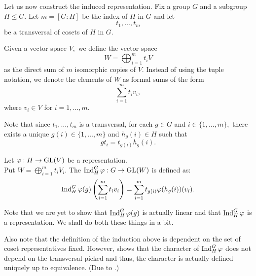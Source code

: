 Let us now construct the induced representation. Fix a group $G$ and a subgroup $H \le G.$ Let $m = [G : H]$ be the index of $H$ in $G$ and let
\begin{equation*} 
	t_1, \ldots, t_m
\end{equation*}
be a transversal of cosets of $H$ in $G.$ 

\begin{defn}
	Given a vector space $V,$ we define the vector space
	\begin{equation*} 
		W = \bigoplus_{i = 1}^m t_iV
	\end{equation*}
	as the direct sum of $m$ isomorphic copies of $V.$ Instead of using the tuple notation, we denote the elements of $W$ as formal sums of the form
	\begin{equation*} 
		\sum_{i = 1}^{m} t_i v_i,
	\end{equation*}
	where $v_i \in V$ for $i = 1, \ldots, m.$
\end{defn}

\begin{defn}
	\label{defn:gttghg}
	Note that since $t_1, \ldots, t_m$ is a transversal, for each $g \in G$ and $i \in \{1, \ldots, m\},$ there exists a unique $g(i) \in \{1, \ldots, m\}$ and $h_g(i) \in H$ such that
	\begin{equation*} 
		gt_i = t_{g(i)}h_g(i).
	\end{equation*}
\end{defn}

\begin{defn}%
	\label{defn:inducedrep2}
	Let $\varphi : H \to \operatorname{GL}(V)$ be a representation.\\
	Put $W = \bigoplus_{i = 1}^m t_iV_i.$
	The  $\operatorname{Ind}^{G}_{H}\varphi : G \to \operatorname{GL}(W)$ is defined as:
	\begin{equation} \label{eq:inducedrepabs}
		\operatorname{Ind}^{G}_{H}\varphi(g)\left(\sum_{i = 1}^{m}t_iv_i\right) = \sum_{i = 1}^{m}t_{g(i)}\varphi(h_g(i))(v_i).
	\end{equation}
\end{defn}

\begin{rem}
	Note that we are yet to show that $\operatorname{Ind}^{G}_{H}\varphi(g)$ is actually linear and that $\operatorname{Ind}^{G}_{H}\varphi$ is a representation. We shall do both these things in a bit.

	Also note that the definition of the induction above is dependent on the set of coset representatives fixed. However,  shows that the character of $\operatorname{Ind}^{G}_{H}\varphi$ does not depend on the transversal picked and thus, the character is actually defined uniquely up to equivalence. (Due to .)
\end{rem}

